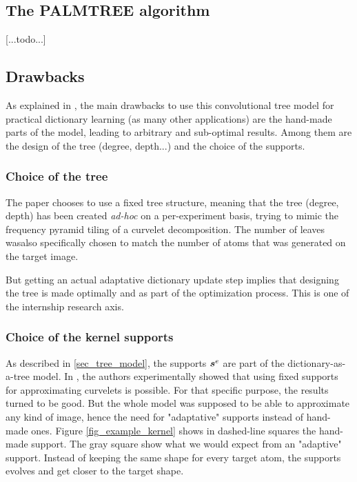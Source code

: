 \subsection{The PALMTREE algorithm}
[...todo...]

\subsection{Drawbacks}
As explained in \cite[p. 23]{chabiron_optimization_2016}, the main drawbacks to use this convolutional tree model for practical dictionary learning (as many other applications) are the hand-made parts of the model, leading to arbitrary and sub-optimal results. Among them are the design of the tree (degree, depth...) and the choice of the supports. %
\subsubsection{Choice of the tree}
The paper chooses to use a fixed tree structure, meaning that the tree (degree, depth) has been created \emph{ad-hoc} on a per-experiment basis, trying to mimic the frequency pyramid tiling of a curvelet decomposition. The number of leaves wasalso specifically chosen to match the number of atoms that was generated on the target image.

But getting an actual adaptative dictionary update step implies that designing the tree is made optimally and as part of the optimization process. This is one of the internship research axis.

\subsubsection{Choice of the kernel supports}

As described in \cref{sec_tree_model}, the supports $\bm{s}^e$ are part of the dictionary-as-a-tree model. In \cite{chabiron_toward_2015}, the authors experimentally showed that using fixed supports for approximating curvelets is possible. For that specific purpose, the results turned to be good. But the whole model was supposed to be able to approximate any kind of image, hence the need for "adaptative" supports instead of hand-made ones. Figure \ref{fig_example_kernel} shows in dashed-line squares the hand-made support. The gray square show what we would expect from an "adaptive" support. Instead of keeping the same shape for every target atom, the supports evolves and get closer to the target shape.

